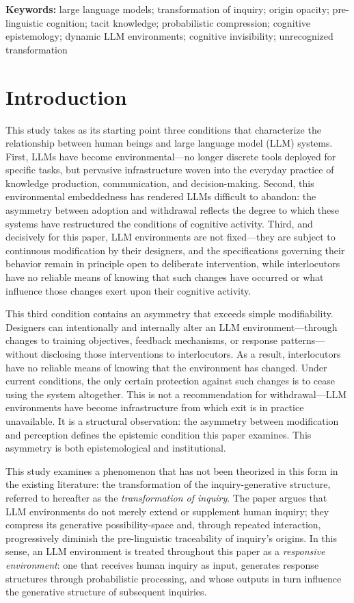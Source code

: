 \documentclass[12pt]{article}
\begin{document}
\noindent\textbf{Keywords:} large language models; transformation of inquiry; origin opacity; pre-linguistic cognition; tacit knowledge; probabilistic compression; cognitive epistemology; dynamic LLM environments; cognitive invisibility; unrecognized transformation

\section{Introduction}

This study takes as its starting point three conditions that characterize the relationship between human beings and large language model (LLM) systems. First, LLMs have become environmental---no longer discrete tools deployed for specific tasks, but pervasive infrastructure woven into the everyday practice of knowledge production, communication, and decision-making. Second, this environmental embeddedness has rendered LLMs difficult to abandon: the asymmetry between adoption and withdrawal reflects the degree to which these systems have restructured the conditions of cognitive activity. Third, and decisively for this paper, LLM environments are not fixed---they are subject to continuous modification by their designers, and the specifications governing their behavior remain in principle open to deliberate intervention, while interlocutors have no reliable means of knowing that such changes have occurred or what influence those changes exert upon their cognitive activity.

This third condition contains an asymmetry that exceeds simple modifiability. Designers can intentionally and internally alter an LLM environment---through changes to training objectives, feedback mechanisms, or response patterns---without disclosing those interventions to interlocutors. As a result, interlocutors have no reliable means of knowing that the environment has changed. Under current conditions, the only certain protection against such changes is to cease using the system altogether. This is not a recommendation for withdrawal---LLM environments have become infrastructure from which exit is in practice unavailable. It is a structural observation: the asymmetry between modification and perception defines the epistemic condition this paper examines. This asymmetry is both epistemological and institutional.

This study examines a phenomenon that has not been theorized in this form in the existing literature: the transformation of the inquiry-generative structure, referred to hereafter as the \emph{transformation of inquiry}. The paper argues that LLM environments do not merely extend or supplement human inquiry; they compress its generative possibility-space and, through repeated interaction, progressively diminish the pre-linguistic traceability of inquiry's origins. In this sense, an LLM environment is treated throughout this paper as a \emph{responsive environment}: one that receives human inquiry as input, generates response structures through probabilistic processing, and whose outputs in turn influence the generative structure of subsequent inquiries.
\end{document}
